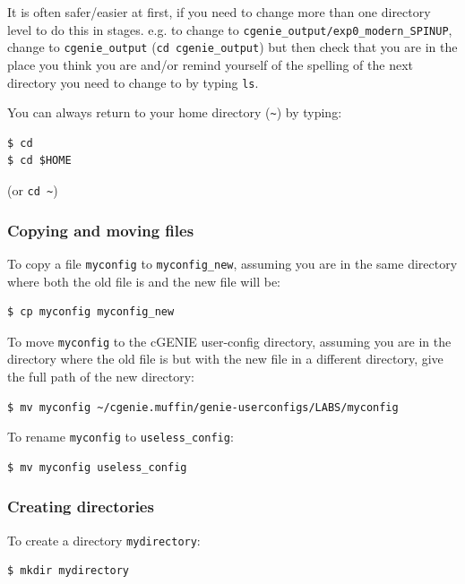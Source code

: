 \noindent It is often safer/easier at first, if you need to change more than one directory level to do this in stages. e.g. to change to \texttt{cgenie\_output/exp0\_modern\_SPINUP}, change to \texttt{cgenie\_output} (\texttt{cd cgenie\_output}) but then check that you are in the place you think you are and/or remind yourself of the spelling of the next directory you need to change to by typing \texttt{ls}.

You can always return to your home directory (\texttt{\~}) by typing:
\small\begin{verbatim}
$ cd
$ cd $HOME
\end{verbatim}\normalsize
(or \texttt{cd \~})

%
\subsubsection*{Copying and moving files}

To copy a file \texttt{myconfig} to \texttt{myconfig\_new}, assuming you are in the same directory where both the old file is and the new file will be:
\small\begin{verbatim}
$ cp myconfig myconfig_new
\end{verbatim}\normalsize

To move \texttt{myconfig} to the cGENIE user-config directory, assuming you are in the directory where the old file is but with the new file in a different directory, give the full path of the new directory:
\small\begin{verbatim}
$ mv myconfig ~/cgenie.muffin/genie-userconfigs/LABS/myconfig
\end{verbatim}\normalsize

To rename \texttt{myconfig} to \texttt{useless\_config}:
\small\begin{verbatim}
$ mv myconfig useless_config
\end{verbatim}\normalsize

%
\subsubsection*{Creating directories}

To create a directory \texttt{mydirectory}:
\small\begin{verbatim}
$ mkdir mydirectory
\end{verbatim}\normalsize

%
